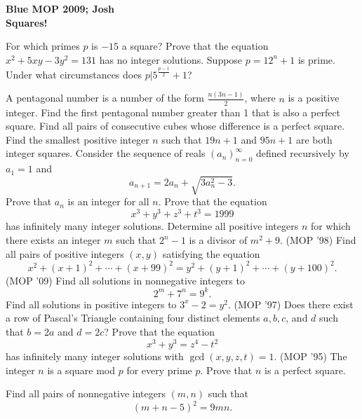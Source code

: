 \documentclass[11pt]{article}
\begin{document}
{\bf \noindent Blue MOP 2009; Josh \\ Squares!}

\be

\ii For which primes $p$ is $-15$ a square?
\ii Prove that the equation $x^2+5xy-3y^2 = 131$ has no integer solutions.
\ii Suppose $p=12^n+1$ is prime.  Under what circumstances does $p|5^{\frac{p-1}2}+1$?

\ii A pentagonal number is a number of the form $\frac{n(3n-1)}2$, where $n$ is a positive integer.  Find the first pentagonal number greater than 1 that is also a perfect square.
\ii Find all pairs of consecutive cubes whose difference is a perfect square.
\ii Find the smallest positive integer $n$ such that $19n+1$ and $95n+1$ are both integer squares.
\ii Consider the sequence of reals $(a_n)_{n=0}^\infty$ defined recursively by $a_1=1$ and \[a_{n+1} = 2a_n + \sqrt{3a_n^2-3}.\]  Prove that $a_n$ is an integer for all $n$.
\ii Prove that the equation \[x^3+y^3+z^3+t^3 = 1999\] has infinitely many integer solutions. %
\ii Determine all positive integers $n$ for which there exists an
integer $m$ such that $2^n-1$ is a divisor of $m^2 + 9$.
\ii (MOP '98) Find all pairs of positive integers $(x,y)$ satisfying the equation
\[
x^{2} + (x+1)^{2} + \cdots + (x+99)^{2} = y^{2} + (y+1)^{2} + \cdots
+ (y+100)^{2}.
\]
\ii (MOP '09) Find all solutions in nonnegative integers to \[2^m+7^n = 9^k.\]
\ii Find all solutions in positive integers to $3^x-2=y^2$.
\ii (MOP '97) Does there exist a row of Pascal's Triangle containing four distinct
elements $a, b, c$, and $d$ such that $b=2a$ and $d= 2c$?
\ii Prove that the equation \[x^3+y^3 = z^4 - t^2\] has infinitely many integer solutions with $\gcd(x,y,z,t) = 1$.
\ii (MOP '95) The integer $n$ is a square mod $p$ for every prime $p$. Prove that $n$ is a perfect square.

\ii Find all pairs of nonnegative integers $(m, n)$ such that
\[
(m+n-5)^2 = 9mn.
\]

\ee
\end{document}
